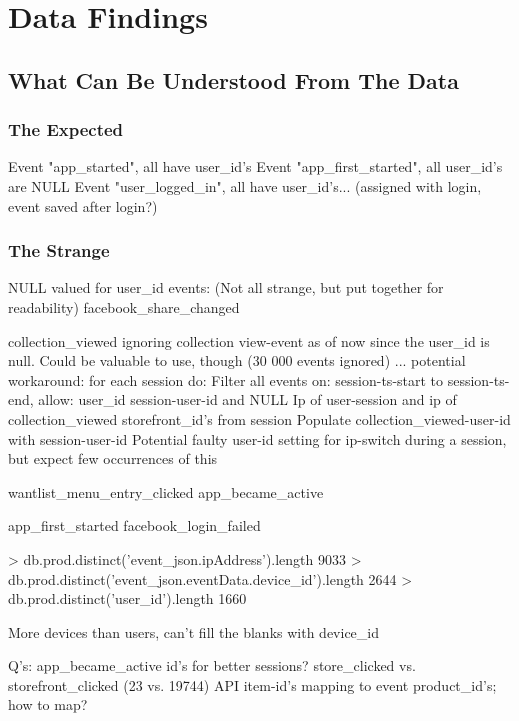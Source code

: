 \section{Data Findings}
\subsection{What Can Be Understood From The Data}


\subsubsection{The Expected}
Event "app\_started", all have user\_id's
Event "app\_first\_started", all user\_id's are NULL
Event "user\_logged\_in", all have user\_id's... (assigned with login, event saved after login?)

\subsubsection{The Strange}
NULL valued  for user\_id events: (Not all strange, but put together for readability)
facebook\_share\_changed

collection\_viewed  ignoring collection view-event as of now since the user\_id is null. Could be valuable to use, though (30 000 events ignored) ...
potential workaround:
    for each session do:
        Filter all events on:
            session-ts-start to session-ts-end,
            allow: user\_id session-user-id and NULL
            Ip of user-session and ip of collection\_viewed
            storefront\_id's from session
                Populate collection\_viewed-user-id with session-user-id
Potential faulty user-id setting for ip-switch during a session, but expect few occurrences of this

wantlist\_menu\_entry\_clicked
app\_became\_active

app\_first\_started
facebook\_login\_failed

> db.prod.distinct('event\_json.ipAddress').length
9033
> db.prod.distinct('event\_json.eventData.device\_id').length
2644
> db.prod.distinct('user\_id').length
1660

More devices than users, can't fill the blanks with device\_id

Q's:
    app\_became\_active id's for better sessions?
    store\_clicked vs. storefront\_clicked (23 vs. 19744)
    API item-id's mapping to event product\_id's; how to map?

